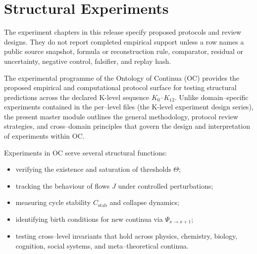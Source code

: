 
\section{Structural Experiments}

The experiment chapters in this release specify proposed protocols and review designs. They do not report completed empirical support unless a row names a public source snapshot, formula or reconstruction rule, comparator, residual or uncertainty, negative control, falsifier, and replay hash.
\label{sec:experiments-master}

The experimental programme of the Ontology of Continua (OC) provides the
proposed empirical and computational protocol surface for testing structural predictions
across the declared K-level sequence $K_0$–$K_{12}$.
Unlike domain–specific experiments contained in the per–level files
(the K-level experiment design series), the present master module outlines the
general methodology, protocol review strategies, and cross–domain principles
that govern the design and interpretation of experiments within OC.

Experiments in OC serve several structural functions:
\begin{itemize}
    \item verifying the existence and saturation of thresholds $\Theta$;
    \item tracking the behaviour of flows $J$ under controlled perturbations;
    \item measuring cycle stability $C_{\mathrm{stab}}$ and collapse dynamics;
    \item identifying birth conditions for new continua via $\Psi_{x\to x+1}$;
    \item testing cross–level invariants that hold across physics, chemistry,
          biology, cognition, social systems, and meta–theoretical continua.
\end{itemize}

